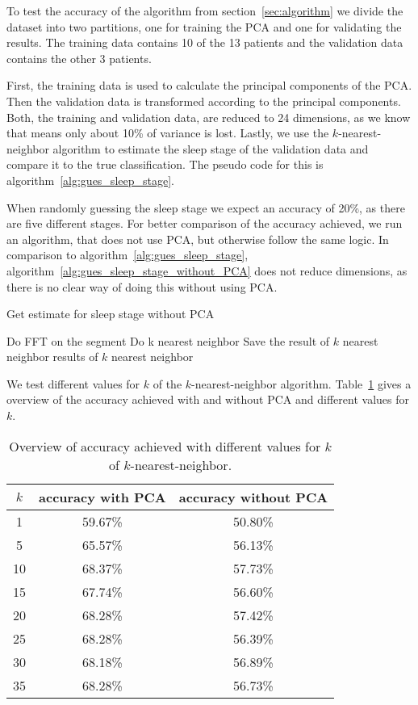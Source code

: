 To test the accuracy of the algorithm from section~\ref{sec:algorithm} we divide the dataset into two partitions, one for training the PCA and one for validating the results. The training data contains 10 of the 13 patients and the validation data contains the other 3 patients.

First, the training data is used to calculate the principal components of the PCA. Then the validation data is transformed according to the principal components. Both, the training and validation data, are reduced to 24 dimensions, as we know that means only about 10\% of variance is lost. Lastly, we use the $k$-nearest-neighbor algorithm to estimate the sleep stage of the validation data and compare it to the true classification. The pseudo code for this is algorithm~\ref{alg:gues_sleep_stage}.

When randomly guessing the sleep stage we expect an accuracy of 20\%, as there are five different stages. For better comparison of the accuracy achieved, we run an algorithm, that does not use PCA, but otherwise follow the same logic. In comparison to algorithm~\ref{alg:gues_sleep_stage}, algorithm~\ref{alg:gues_sleep_stage_without_PCA} does not reduce dimensions, as there is no clear way of doing this without using PCA.

\begin{algorithm}
	\caption{Get estimate for sleep stage without PCA}\label{alg:gues_sleep_stage_without_PCA}
	\begin{algorithmic}
		\State Do FFT on the segment
		\State Do k nearest neighbor
		\State Save the result of $k$ nearest neighbor
		\EndFor
		\State \Return results of $k$ nearest neighbor
	\end{algorithmic}
\end{algorithm}

We test different values for $k$ of the $k$-nearest-neighbor algorithm. Table~\ref{tab:error_validation_overview} gives a overview of the accuracy achieved with and without PCA and different values for $k$.

\begin{table}
	\centering
	\begin{tabular}{c|c|c}
		$k$ & accuracy with PCA & accuracy without PCA \\
		\hline
		1  & 59.67\% & 50.80\% \\
		5  & 65.57\% & 56.13\% \\
		10 & 68.37\% & 57.73\% \\
		15 & 67.74\% & 56.60\% \\
		20 & 68.28\% & 57.42\% \\
		25 & 68.28\% & 56.39\% \\
		30 & 68.18\% & 56.89\% \\
		35 & 68.28\% & 56.73\% \\
	\end{tabular}
	\caption{Overview of accuracy achieved with different values for $k$ of $k$-nearest-neighbor.}
	\label{tab:error_validation_overview}
\end{table}

